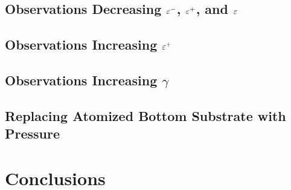 \subsection{Observations Decreasing $\varepsilon^-$, $\varepsilon^+$, and $\varepsilon$}

\subsection{Observations Increasing $\varepsilon^+$}

\subsection{Observations Increasing $\gamma$}

\subsection{Replacing Atomized Bottom Substrate with Pressure}




\section{Conclusions}